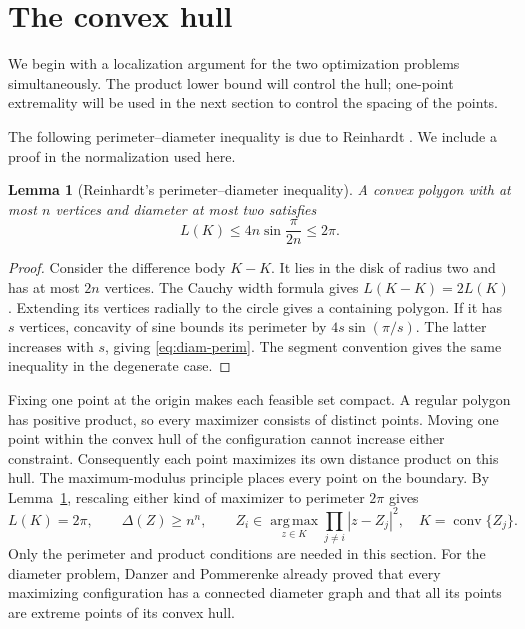 \documentclass[11pt,reqno]{amsart}
\numberwithin{equation}{section}
\newtheorem{lemma}[theorem]{Lemma}
\theoremstyle{definition}
\theoremstyle{remark}
\DeclareMathOperator{\conv}{conv}
\begin{document}
\section{The convex hull}\label{sec:roundness}
We begin with a localization argument for the two optimization problems simultaneously. The product lower bound will control the hull; one-point extremality will be used in the next section to control the spacing of the points.

The following perimeter--diameter inequality is due to Reinhardt \cite{reinhardt}. We include a proof in the normalization used here.
\begin{lemma}[Reinhardt's perimeter--diameter inequality]\label{lem:diam-perim}
A convex polygon with at most $n$ vertices and diameter at most two satisfies
\begin{equation}\label{eq:diam-perim}
 L(K)\le4n\sin\frac\pi{2n}\le2\pi.
\end{equation}
\end{lemma}
\begin{proof}
Consider the difference body $K-K$. It lies in the disk of radius two and has at most $2n$ vertices. The Cauchy width formula gives $L(K-K)=2L(K)$. Extending its vertices radially to the circle gives a containing polygon. If it has $s$ vertices, concavity of sine bounds its perimeter by $4s\sin(\pi/s)$. The latter increases with $s$, giving \eqref{eq:diam-perim}. The segment convention gives the same inequality in the degenerate case.
\end{proof}

Fixing one point at the origin makes each feasible set compact. A regular polygon has positive product, so every maximizer consists of distinct points. Moving one point within the convex hull of the configuration cannot increase either constraint. Consequently each point maximizes its own distance product on this hull. The maximum-modulus principle places every point on the boundary. By Lemma~\ref{lem:diam-perim}, rescaling either kind of maximizer to perimeter $2\pi$ gives
\begin{equation}\label{eq:common-input}
 L(K)=2\pi,\qquad \Delta(Z)\ge n^n,\qquad
 Z_i\in\operatorname*{arg\,max}_{z\in K}\prod_{j\ne i}|z-Z_j|^2,
 \quad K=\conv\{Z_j\}.
\end{equation}
Only the perimeter and product conditions are needed in this section. For the diameter problem, Danzer and Pommerenke \cite[remark on pp.~101--102 and footnote~1]{danzer-pommerenke} already proved that every maximizing configuration has a connected diameter graph and that all its points are extreme points of its convex hull.
\end{document}
